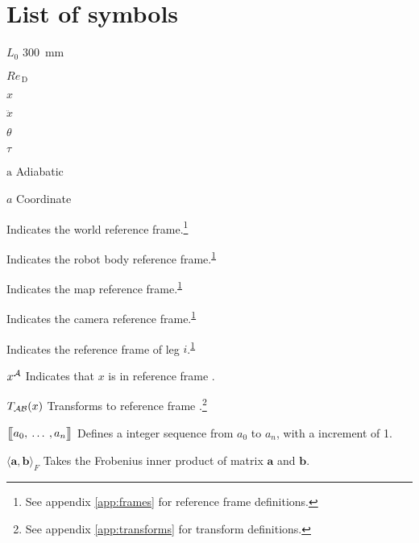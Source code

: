 \chapter{List of symbols}

\begin{Nomencl}[2.75cm]
    \item[$L_0$] \qty{300}{mm}

    \item[$\mathit{Re}_\mathrm{\,D}$]
    \item[$x$]         
    \item[$\ddot{x}$]  \\
    
    \item[$\theta$]    
    \item[$\tau$]      



    \item[$\mathrm{a}$] Adiabatic
    \item[$a$]          Coordinate
    \item[\fworld] Indicates the world reference frame.\footnote{\label{note1}See appendix \ref{app:frames} for reference frame definitions.}
    \item[\fbody] Indicates the robot body reference frame.\textsuperscript{\ref{note1}}
    \item[\fmap] Indicates the map reference frame.\textsuperscript{\ref{note1}}
    \item[\fcamera] Indicates the camera reference frame.\textsuperscript{\ref{note1}}
    \item[\fleg] Indicates the reference frame of leg \(i\).\textsuperscript{\ref{note1}}

\newpage
{}
    \item[\(x\inrefframe{A}\)] Indicates that \(x\) is in reference frame .
    \item[\(\transframe{x}{\refframe{A}}{\refframe{B}}\)] Transforms  to reference frame .\footnote{See appendix \ref{app:transforms} for transform definitions.}
    \item[\(\seq{a_0}{a_1}{a_n}\)] Defines a integer sequence from \(a_0\) to \(a_n\), with a increment of 1.
    \item[\(\langle \bm{a}, \bm{b} \rangle_F\)] Takes the Frobenius inner product of matrix \(\bm{a}\) and \(\bm{b}\).


\end{Nomencl}
